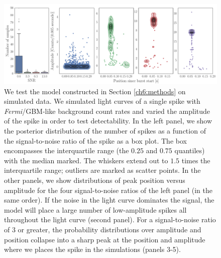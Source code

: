 \documentclass[12pt]{emulateapj}
\newcommand{\project}[1]{\textsl{#1}}
\newcommand{\fermi}{\project{Fermi}}
\begin{document}
\begin{figure}[htbp]
\includegraphics[width=\textwidth]{f4a.pdf}%
\caption{We test the model constructed in Section \ref{ch6:methods} on simulated data. We simulated light curves of a single spike with \fermi/GBM-like background count rates and
varied the amplitude of the spike in order to test detectability. In the left panel, we show the posterior distribution of the number of spikes as a function of the signal-to-noise ratio of the spike
 as a box plot. The box encompasses the interquartile range (the $0.25$ and $0.75$ quantiles) with the median marked. The whiskers extend out to $1.5$ times the interquartile range; 
 outliers are marked as scatter points. In the other panels, we show distributions of peak position versus amplitude for the four signal-to-noise ratios of the left panel (in the same order). If the noise 
 in the light curve dominates the signal, the model will place a large number of low-amplitude spikes all throughout the light curve (second panel). For a signal-to-noise ratio of 3 or greater, the 
 probability distributions over amplitude and position collapse into a sharp peak at the position and amplitude where we places the spike in the simulations (panels 3-5).}
\label{fig:onespike}
\end{figure}
\end{document}
